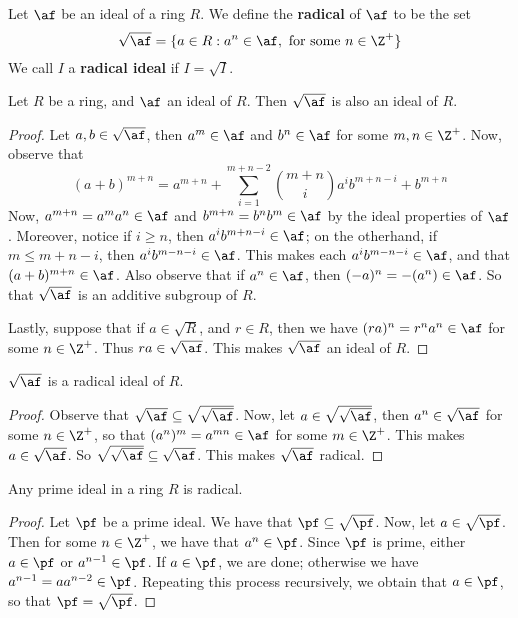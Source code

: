 \begin{definition}
    Let $\af$ be an ideal of a ring  $R$. We define the  \textbf{radical} of
    $\af$
    to be the set
    \begin{equation*}
        \sqrt{\af}=\{a \in R : a^n \in \af, \text{ for some } n \in \Z^+\}
    \end{equation*}
    We call $I$ a \textbf{radical ideal} if $I=\sqrt{I}$.
\end{definition}

\begin{lemma}\label{1.3.3}
    Let $R$ be a ring, and $\af$ an ideal of $R$. Then $\sqrt{\af}$ is also an
    ideal of $R$.
\end{lemma}
\begin{proof}
    Let $a,b \in \sqrt{\af}$, then $a^m \in \af$ and $b^n \in \af$ for some $m,n
    \in \Z^+$. Now, observe that
    \begin{equation*}
        (a+b)^{m+n}=a^{m+n}+\sum_{i=1}^{m+n-2}{{m+n \choose
        i}a^{i}b^{m+n-i}}+b^{m+n}
    \end{equation*}
    Now, $a^{m+n}=a^ma^n \in \af$ and $b^{m+n}=b^nb^m \in \af$ by the ideal
    properties of $\af$. Moreover, notice if $i \geq n$, then $a^ib^{m+n-i} \in
    \af$; on the otherhand, if $m \leq m+n-i$, then $a^ib^{m-n-i} \in \af$. This
    makes each $a^ib^{m-n-i} \in \af$, and that $(a+b)^{m+n} \in \af$. Also
    observe that if $a^n \in \af$, then $(-a)^n=-(a^n) \in \af$. So that
    $\sqrt{\af}$ is an additive subgroup of $R$.

    Lastly, suppose that if $a \in \sqrt{R}$, and $r \in R$, then we have
    $(ra)^n=r^na^n \in \af$ for some $n \in \Z^+$. Thus $ra \in \sqrt{\af}$. This
    makes $\sqrt{\af}$ an ideal of $R$.
\end{proof}
\begin{corollary}
    $\sqrt{\af}$ is a radical ideal of $R$.
\end{corollary}
\begin{proof}
    Observe that $\sqrt{\af} \subseteq \sqrt{\sqrt{\af}}$. Now, let $a \in
    \sqrt{\sqrt{\af}}$, then $a^n \in \sqrt{\af}$ for some $n \in \Z^+$, so that
    $(a^n)^m=a^{mn} \in \af$ for some $m \in \Z^+$. This makes $a \in
    \sqrt{\af}$. So $\sqrt{\sqrt{\af}} \subseteq \sqrt{\af}$. This makes
    $\sqrt{\af}$ radical.
\end{proof}

\begin{lemma}\label{1.3.4}
    Any prime ideal in a ring $R$ is radical.
\end{lemma}
\begin{proof}
    Let $\pf$ be a prime ideal. We have that $\pf \subseteq \sqrt{\pf}$. Now, let
    $a \in \sqrt{\pf}$. Then for some $n \in \Z^+$, we have that $a^n \in \pf$.
    Since $\pf$ is prime, either $a \in \pf$ or $a^{n-1} \in \pf$. If $a \in
    \pf$, we are done; otherwise we have $a^{n-1}=aa^{n-2} \in \pf$. Repeating
    this process recursively, we obtain that $a \in \pf$, so that
    $\pf=\sqrt{\pf}$.
\end{proof}


